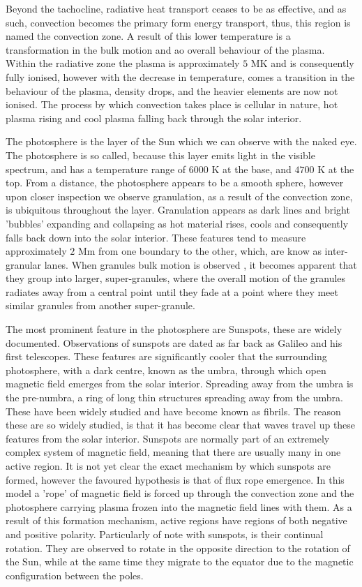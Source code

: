 Beyond the tachocline, radiative heat transport ceases to be as effective, and as such, convection becomes the primary form energy transport, thus, this region is named the convection zone. 
A result of this lower temperature is a transformation in the bulk motion and ao overall behaviour of the plasma.
Within the radiative zone the plasma is approximately $5$ MK and is consequently fully ionised, however with the decrease in temperature, comes a transition in the behaviour of the plasma, density drops, and the heavier elements are now not ionised.
The process by which convection takes place is cellular in nature, hot plasma rising and cool plasma falling back through the solar interior.
 


The photosphere is the layer of the Sun which we can observe with the naked eye.
The photosphere is so called, because this layer emits light in the visible spectrum, and has a temperature range of $6000$ K at the base, and $4700$ K at the top. 
From a distance, the photosphere appears to be a smooth sphere, however upon closer inspection we observe granulation, as a result of the convection zone, is ubiquitous throughout the layer.
Granulation appears as dark lines and bright 'bubbles' expanding and collapsing as hot material rises, cools and consequently falls back down into the solar interior.
These features tend to measure approximately $2$ Mm from one boundary to the other, which, are know as inter-granular lanes.
When granules bulk motion is observed , it becomes apparent that they group into larger, super-granules, where the overall motion of the granules radiates away from a central point until they fade at a point where they meet similar granules from another super-granule.

The most prominent feature in the photosphere are Sunspots, these are widely documented.
Observations of sunspots are dated as far back as Galileo and his first telescopes.
These features are significantly cooler that the surrounding photosphere, with a dark centre, known as the umbra, through which open magnetic field emerges from the solar interior.
Spreading away from the umbra is the pre-numbra, a ring of long thin structures spreading away from the umbra.
These have been widely studied and have become known as fibrils.
The reason these are so widely studied, is that it has become clear that waves travel up these features from the solar interior.
Sunspots are normally part of an extremely complex system of magnetic field, meaning that there are usually many in one active region.
It is not yet clear the exact mechanism by which sunspots are formed, however the favoured hypothesis is that of flux rope emergence.
In this model a 'rope' of magnetic field is forced up through the convection zone and the photosphere carrying plasma frozen into the magnetic field lines with them.
As a result of this formation mechanism, active regions have regions of both negative and positive polarity.
Particularly of note with sunspots, is their continual rotation.
They are observed to rotate in the opposite direction to the rotation of the Sun, while at the same time they migrate to the equator due to the magnetic configuration between the poles.


